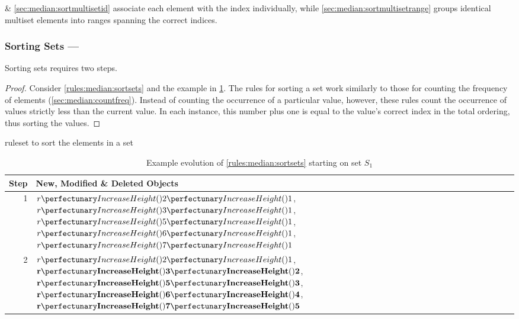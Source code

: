  \& \cref{sec:median:sortmultisetid} associate each element with the index individually, while \cref{sec:median:sortmultisetrange} groups identical multiset elements into ranges spanning the correct indices.

\subsubsection{Sorting Sets --- }  \label{sec:median:sortsets}

\begin{proposition}\label{prop:median:sortsets}
Sorting sets requires two steps.
\end{proposition}

\begin{proof}
Consider \cref{rules:median:sortsets} and the example in \cref{tab:median:sortsets}.  The rules for sorting a set work similarly to those for counting the frequency of elements (\cref{sec:median:countfreq}).  Instead of counting the occurrence of a particular value, however, these rules count the occurrence of values strictly less than the current value.  In each instance, this number plus one is equal to the value's correct index in the total ordering, thus sorting the values.
\end{proof}

\begin{cprulesetfloat}
\begin{cpruleset}

\end{cpruleset}
\caption{\label{rules:median:sortsets}\Gls{ruleset} to sort the elements in a set}
\end{cprulesetfloat}

\begin{table}[htbp]
\centering
   \begin{tabular}{|r|l|}
    \hline
    \textbf{Step} & \textbf{New, Modified \& Deleted Objects} \\ \hline
    1 & \(\cpfuncn{r}{2}{1}\), \(\cpfuncn{r}{3}{1}\), \(\cpfuncn{r}{5}{1}\), \(\cpfuncn{r}{6}{1}\), \(\cpfuncn{r}{7}{1}\)\\ \hline
    2 & \(\cpfuncn{r}{2}{1}\), \(\mathbf{\cpfuncn{r}{3}{2}}\), \(\mathbf{\cpfuncn{r}{5}{3}}\), \(\mathbf{\cpfuncn{r}{6}{4}}\), \(\mathbf{\cpfuncn{r}{7}{5}}\)\\ \hline

\end{tabular}
\caption[Example evolution of \cref{rules:median:sortsets}]{\label{tab:median:sortsets}Example evolution of \cref{rules:median:sortsets} starting on set \(S_1\)}
\end{table}

